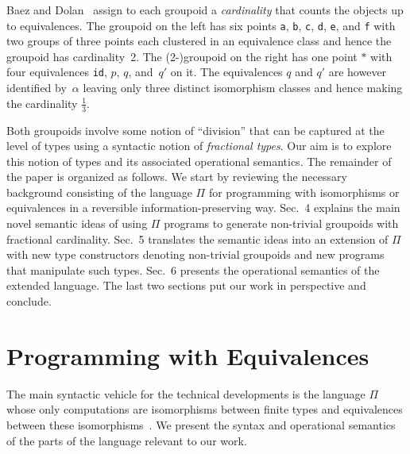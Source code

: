 \documentclass[a4paper,USenglish]{lipics-v2016-utf8x}
\begin{document}
\medskip\noindent Baez and Dolan~\cite{groupoidcard} assign to each groupoid a
\emph{cardinality} that counts the objects up to equivalences. The groupoid on
the left has six points \texttt{a}, \texttt{b}, \texttt{c}, \texttt{d},
\texttt{e}, and \texttt{f} with two groups of three points each clustered in an
equivalence class and hence the groupoid has cardinality~2. The (2-)groupoid on
the right has one point $\ast$ with four equivalences \texttt{id}, $p$, $q$,
and~$q'$ on it. The equivalences $q$ and $q'$ are however identified by~$\alpha$
leaving only three distinct isomorphism classes and hence making the cardinality
$\frac{1}{3}$.

Both groupoids involve some notion of ``division'' that can be captured at the
level of types using a syntactic notion of \emph{fractional types}. Our aim is
to explore this notion of types and its associated operational semantics. The
remainder of the paper is organized as follows. We start by reviewing the
necessary background consisting of the language $\Pi$ for programming with
isomorphisms or equivalences in a reversible information-preserving way. Sec.~4
explains the main novel semantic ideas of using $\Pi$ programs to generate
non-trivial groupoids with fractional cardinality. Sec.~5 translates the
semantic ideas into an extension of $\Pi$ with new type constructors denoting
non-trivial groupoids and new programs that manipulate such types. Sec.~6
presents the operational semantics of the extended language. The last two
sections put our work in perspective and conclude.

\section{Programming with Equivalences}
\label{sec:pi}

The main syntactic vehicle for the technical developments
is the language $\Pi$ whose only computations are isomorphisms
between finite types and equivalences between these
isomorphisms~\cite{Carette2016,James:2012:IE:2103656.2103667}. We
present the syntax and operational semantics of the parts of the
language relevant to our work.
\end{document}
